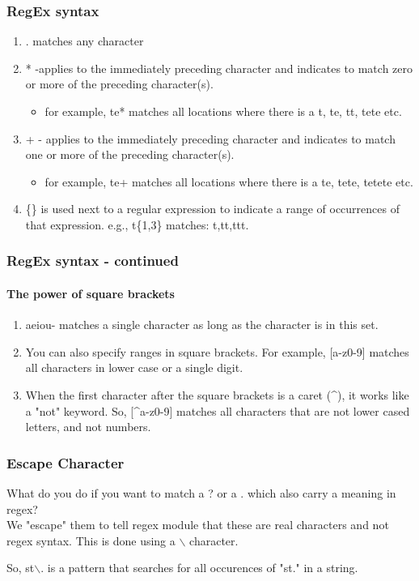\documentclass{beamer}
\begin{document}
\begin{frame}
\frametitle{RegEx syntax}
\begin{enumerate}
\item . matches any character
\item * -applies to the immediately preceding character and indicates to match zero or more of the preceding character(s).
\begin{itemize}
\item for example, te* matches all locations where there is a t, te, tt, tete etc.
\end{itemize}
\item + - applies to the immediately preceding character and indicates to match one or more of the preceding character(s).
\begin{itemize}
\item for example, te+ matches all locations where there is a te, tete, tetete etc.
\end{itemize}
\item \{\} is used next to a regular expression to indicate a range of occurrences of that expression. e.g., t\{1,3\} matches: t,tt,ttt. 
\end{enumerate}
\end{frame}

\begin{frame}
\frametitle{RegEx syntax - continued}
\framesubtitle{The power of square brackets}
\begin{enumerate}
\item \lbrack aeiou\rbrack - matches a single character as long as the character is in this set.
\item You can also specify ranges in square brackets. For example, [a-z0-9] matches all characters in lower case or a single digit.
\item When the first character after the square brackets is a caret (\^{}), it works like a "not" keyword. So, [\^{}a-z0-9] matches all characters that are not lower cased letters, and not numbers.
\end{enumerate}
\end{frame}

\begin{frame}
\frametitle{Escape Character}
What do you do if you want to match a ? or a . which also carry a meaning in regex? \pause
\\ We "escape" them to tell regex module that these are real characters and not regex syntax. This is done using a $\backslash$ character. 

 \medskip So, st$\backslash$. is a pattern that searches for all occurences of "st." in a string.
\end{frame}
\end{document}

